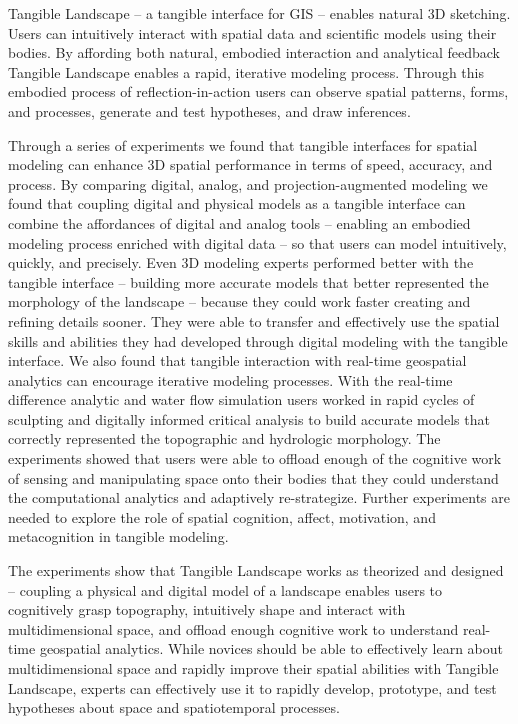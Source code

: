 \documentclass[prodmode,acmtochi]{acmsmall} %
\begin{document}
Tangible Landscape -- a tangible interface for GIS -- 
enables natural 3D sketching. %
Users can intuitively interact with 
spatial data and scientific models using their bodies. 
By affording both natural, embodied interaction and analytical feedback
Tangible Landscape enables a
rapid, iterative modeling process.
Through this embodied process of reflection-in-action 
users can 
observe spatial patterns, forms, and processes, 
generate and test hypotheses, 
and draw inferences. 

Through a series of experiments
we found that tangible interfaces for spatial modeling
can enhance 3D spatial performance 
in terms of speed, accuracy, and process. 
By comparing digital, analog, and projection-augmented modeling 
we found that coupling digital and physical models as a tangible interface 
can combine the affordances of digital and analog tools
-- enabling an embodied modeling process enriched with digital data --
so that users can model intuitively, quickly, and precisely. 
Even 3D modeling experts 
 performed better with the tangible interface 
-- building more accurate models 
that better represented the morphology of the landscape --
 because they could work faster
 creating and refining details sooner.
They were able to transfer and effectively use the
spatial skills and abilities they had developed through digital modeling
with the tangible interface.
We also found that tangible interaction with real-time geospatial analytics
can encourage iterative modeling processes.
With the real-time difference analytic and water flow simulation  
users worked in rapid cycles of 
sculpting and digitally informed critical analysis
to build accurate models that
correctly represented the topographic and hydrologic morphology.
The experiments showed that users 
were able to offload enough of the cognitive work 
of sensing and manipulating space
onto their bodies
that they could understand the
computational analytics
and adaptively re-strategize.
Further experiments are needed
to explore the role of 
spatial cognition, affect, motivation, and metacognition 
in tangible modeling.

The experiments show that Tangible Landscape 
works as theorized and designed -- 
coupling a physical and digital model of a landscape
enables users to 
cognitively grasp topography,
intuitively shape and interact with multidimensional space, 
and offload enough cognitive work to understand 
real-time geospatial analytics. 
While novices should be able to effectively learn about 
multidimensional space and
rapidly improve their spatial abilities 
with Tangible Landscape, 
experts can effectively use it to 
rapidly develop, prototype, and test 
hypotheses about space and spatiotemporal processes.
\end{document}
